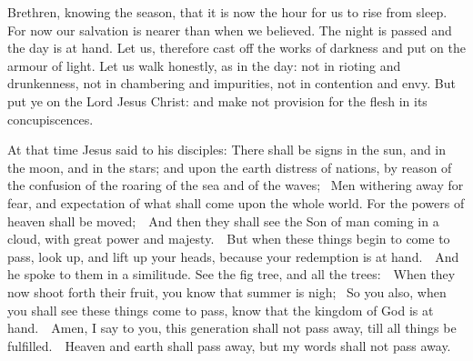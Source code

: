 ﻿



Brethren, knowing the season, that it is now the hour for us to
rise from sleep. For now our salvation is nearer than when we believed.
The night is passed and the day is at hand. Let us, therefore
cast off the works of darkness and put on the armour of light.
Let us walk honestly, as in the day: not in rioting and
drunkenness, not in chambering and impurities, not in contention and
envy.
But put ye on the Lord Jesus Christ: and make not provision for
the flesh in its concupiscences.

\medskip


At that time Jesus said to his disciples: There shall be signs in the sun, and in the moon, and in the stars; and
upon the earth distress of nations, by reason of the confusion of the roaring
of the sea and of the waves;  Men withering away for fear, and expectation of
what shall come upon the whole world. For the powers of heaven shall be
moved;  And then they shall see the Son of man coming in a cloud, with great
power and majesty.  But when these things begin to come to pass, look up, and
lift up your heads, because your redemption is at hand.  And he spoke to them
in a similitude. See the fig tree, and all the trees:  When they now shoot
forth their fruit, you know that summer is nigh;  So you also, when you shall
see these things come to pass, know that the kingdom of God is at hand.  Amen,
I say to you, this generation shall not pass away, till all things be
fulfilled.  Heaven and earth shall pass away, but my words shall not pass away.


\bigskip



